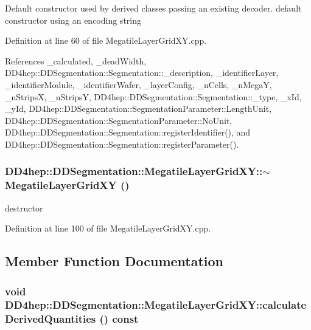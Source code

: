 Default constructor used by derived classes passing an existing decoder. default constructor using an encoding string 

Definition at line 60 of file MegatileLayerGridXY.cpp.

References \_\-calculated, \_\-deadWidth, DD4hep::DDSegmentation::Segmentation::\_\-description, \_\-identifierLayer, \_\-identifierModule, \_\-identifierWafer, \_\-layerConfig, \_\-nCells, \_\-nMegaY, \_\-nStripsX, \_\-nStripsY, DD4hep::DDSegmentation::Segmentation::\_\-type, \_\-xId, \_\-yId, DD4hep::DDSegmentation::SegmentationParameter::LengthUnit, DD4hep::DDSegmentation::SegmentationParameter::NoUnit, DD4hep::DDSegmentation::Segmentation::registerIdentifier(), and DD4hep::DDSegmentation::Segmentation::registerParameter().\hypertarget{class_d_d4hep_1_1_d_d_segmentation_1_1_megatile_layer_grid_x_y_a3ba425f7256a951d0d5b451261023009}{
\subsubsection[{$\sim$MegatileLayerGridXY}]{\setlength{\rightskip}{0pt plus 5cm}DD4hep::DDSegmentation::MegatileLayerGridXY::$\sim$MegatileLayerGridXY ()}}
\label{class_d_d4hep_1_1_d_d_segmentation_1_1_megatile_layer_grid_x_y_a3ba425f7256a951d0d5b451261023009}


destructor 

Definition at line 100 of file MegatileLayerGridXY.cpp.

\subsection{Member Function Documentation}
\hypertarget{class_d_d4hep_1_1_d_d_segmentation_1_1_megatile_layer_grid_x_y_aebab4bf76f81cec67ea1b76c8c95cea6}{
\subsubsection[{calculateDerivedQuantities}]{\setlength{\rightskip}{0pt plus 5cm}void DD4hep::DDSegmentation::MegatileLayerGridXY::calculateDerivedQuantities () const}}
\label{class_d_d4hep_1_1_d_d_segmentation_1_1_megatile_layer_grid_x_y_aebab4bf76f81cec67ea1b76c8c95cea6}


